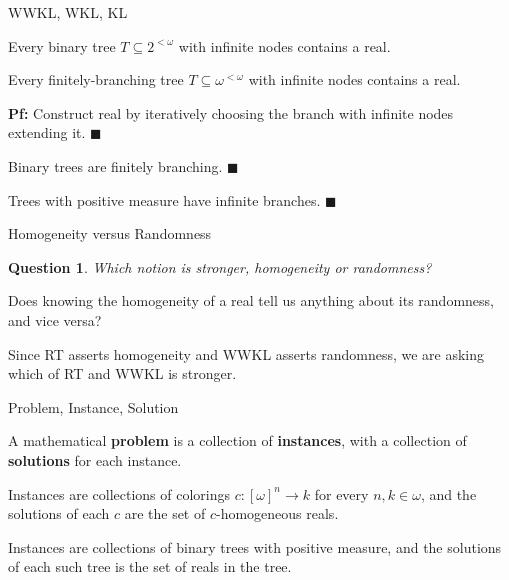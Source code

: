 \begin{frame}{WWKL, WKL, KL}
  \begin{thm*}
    Every binary tree $T\subseteq2^{<\omega}$ with infinite nodes contains
    a real.
  \end{thm*}

  \begin{thm*}
    Every finitely-branching tree $T\subseteq\omega^{<\omega}$ with
    infinite nodes contains a real.
  \end{thm*}
  \textbf{Pf:} Construct real by iteratively choosing the branch with
  infinite nodes extending it. $\blacksquare$

  \begin{observe*}
    Binary trees are finitely branching. $\blacksquare$
  \end{observe*}

  \begin{observe*}
    Trees with positive measure have infinite branches. $\blacksquare$
  \end{observe*}
\end{frame}

\begin{frame}{Homogeneity versus Randomness}
  \newtheorem*{question*}{Question}
  \begin{question*}
    Which notion is stronger, homogeneity or randomness?
  \end{question*}

  \vspace{2em}
  Does knowing the homogeneity of a real tell us anything about its
  randomness, and vice versa?

  \vspace{2em}
  Since RT asserts homogeneity and WWKL asserts randomness, we are asking
  which of RT and WWKL is stronger.
\end{frame}

\begin{frame}{Problem, Instance, Solution}
  \begin{define*}
    A mathematical \textbf{problem} is a collection of \textbf{instances},
    with a collection of \textbf{solutions} for each instance.
  \end{define*}

  \begin{example*}[RT is a problem]
    Instances are collections of colorings $c:[\omega]^n\rightarrow k$ for
    every $n,k\in\omega$, and the solutions of each $c$ are the set of
    $c$-homogeneous reals.
  \end{example*}

  \begin{example*}
    Instances are collections of binary trees with positive measure,
    and the solutions of each such tree is the set of reals in the tree.
  \end{example*}
\end{frame}

